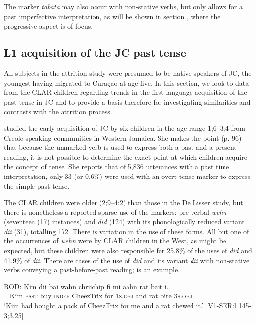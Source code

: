 \documentclass[output=paper,colorlinks,citecolor=brown]{langscibook}
\begin{document}
The marker \textit{tabata} may also occur with non-stative verbs, but only allows for a past imperfective interpretation, as will be shown in section , where the progressive aspect is of focus.


\subsection{L1 acquisition of the JC past tense}\label{sec:messamk:4.2}

All subjects in the attrition study were presumed to be native speakers of JC, the youngest having migrated to Curaçao at age five. In this section, we look to data from the CLAR children regarding trends in the first language acquisition of the past tense in JC and to provide a basis therefore for investigating similarities and contrasts with the attrition process.

\citet[95ff]{DeLisser2015} studied the early acquisition of JC by six children in the age range 1;6--3;4 from Creole-speaking communities in Western Jamaica. She makes the point (p. 96) that because the unmarked verb is used to express both a past and a present reading, it is not possible to determine the exact point at which children acquire the concept of tense. She reports that of 5,836 utterances with a past time interpretation, only 33 (or 0.6\%) were used with an overt tense marker to express the simple past tense.

The CLAR children were older (2;9--4;2) than those in the De Lisser study, but there is nonetheless a reported sparse use of the markers: pre-verbal \textit{wehn} (seventeen (17) instances) and \textit{did} (124) with its phonologically reduced variant \textit{dii} (31), totalling 172. There is variation in the use of these forms. All but one of the occurrences of \textit{wehn} were by CLAR children in the West, as might be expected, but these children were also responsible for 25.8\% of the uses of \textit{did} and 41.9\% of \textit{dii}. There are cases of the use of \textit{did} and its variant \textit{dii} with non-stative verbs conveying a past-before-past reading;  is an example.

\ea \label{bkm:messamK:9}
\gll   ROD:   Kim dii     bai wahn   chriichip    fi   mi       aahn rat bait  i.\\
~ Kim \textsc{past} buy \textsc{indef} CheezTrix for 1\textsc{s.obj} and   rat  bite 3\textsc{s.obj}\\
\glt \hphantom{ROD:}  `Kim had bought a pack of CheezTrix for me and a rat chewed it.’
[V1-SER:l 145-3;3.25]
\z
\end{document}
